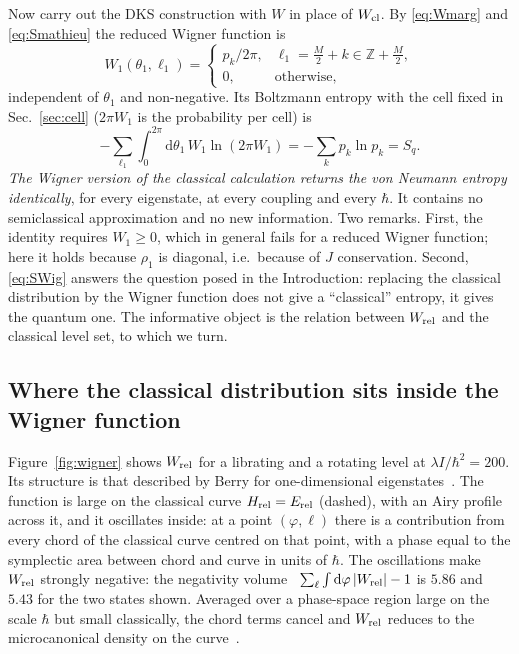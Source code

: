 \documentclass[preprint,12pt]{elsarticle}
\newcommand{\dd}{\mathrm{d}}
\newcommand{\Erel}{E_{\rm rel}}
\begin{document}
Now carry out the DKS construction with $W$ in place of $W_{\rm cl}$. By
\eqref{eq:Wmarg} and \eqref{eq:Smathieu} the reduced Wigner function is
\begin{equation}
W_{1}(\theta_{1},\ell_{1})=\begin{cases}p_{k}/2\pi, & \ell_{1}=\tfrac M2+k\in
\mathbb{Z}+\tfrac M2,\\[2pt] 0, & \text{otherwise},\end{cases}
\label{eq:W1}
\end{equation}
independent of $\theta_{1}$ and non-negative. Its Boltzmann entropy with the
cell fixed in Sec.~\ref{sec:cell} ($2\pi W_{1}$ is the probability per cell) is
\begin{equation}
-\sum_{\ell_{1}}\int_{0}^{2\pi}\dd\theta_{1}\,W_{1}\ln\left(2\pi W_{1}\right)
=-\sum_{k}p_{k}\ln p_{k}=S_{q}.
\label{eq:SWig}
\end{equation}
\emph{The Wigner version of the classical calculation returns the von Neumann
entropy identically}, for every eigenstate, at every coupling and every
$\hbar$. It contains no semiclassical approximation and no new information.
Two remarks. First, the identity requires $W_{1}\ge0$, which in general fails
for a reduced Wigner function; here it holds because $\rho_{1}$ is diagonal,
i.e.\ because of $J$ conservation. Second, \eqref{eq:SWig} answers the question
posed in the Introduction: replacing the classical distribution by the Wigner
function does not give a ``classical'' entropy, it gives the quantum one. The
informative object is the relation between $W_{\rm rel}$ and the classical
level set, to which we turn.

\subsection{Where the classical distribution sits inside the Wigner function}

Figure~\ref{fig:wigner} shows $W_{\rm rel}$ for a librating and a rotating level
at $\lambda I/\hbar^{2}=200$. Its structure is that described by Berry for
one-dimensional eigenstates~\cite{Berry77,OzorioRep}. The function is large on
the classical curve $H_{\rm rel}=\Erel$ (dashed), with an Airy profile across
it, and it oscillates inside: at a point $(\varphi,\ell)$ there is a
contribution from every chord of the classical curve centred on that point,
with a phase equal to the symplectic area between chord and curve in units of
$\hbar$. The oscillations make $W_{\rm rel}$ strongly negative: the negativity
volume~\cite{Kenfack} $\sum_{\ell}\int\dd\varphi\,|W_{\rm rel}|-1$ is $5.86$ and
$5.43$ for the two states shown. Averaged over a phase-space region large on
the scale $\hbar$ but small classically, the chord terms cancel and
$W_{\rm rel}$ reduces to the microcanonical density on the
curve~\cite{Berry77,Voros}.
\end{document}
